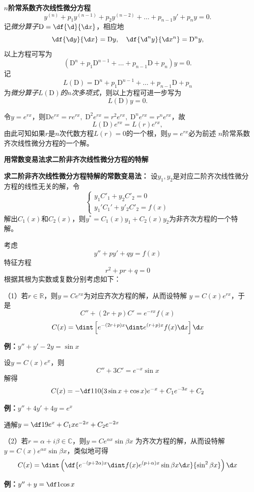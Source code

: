 \begin{shaded}
	{\bf $n$阶常系数齐次线性微分方程}
	$$y^{(n)}+p_1y^{(n-1)}+p_2y^{(n-2)}+\ldots+p_{n-1}y'+p_ny=0.$$
	记{\it 微分算子}$\mathrm{D}=\df{\d}{\d x}$，相应地
	$$\df{\d y}{\d x}=\mathrm{D}y,\quad \df{\d^n y}{\d x^n}=\mathrm{D}^ny,$$
	以上方程可写为
	$$(\mathrm{D}^n+p_1\mathrm{D}^{n-1}+\ldots+p_{n-1}\mathrm{D}
	+p_n)y=0.$$
	记
	$$L(\mathrm{D})=\mathrm{D}^n+p_1\mathrm{D}^{n-1}+\ldots+p_{n-1}\mathrm{D}
	+p_n$$
	为{\it 微分算子$L(\mathrm{D})$的$n$次多项式}，则以上方程可进一步写为
	$$L(\mathrm{D})y=0.$$
	
	令$y=e^{rx}$，则$\mathrm{D}e^{rx}=re^{rx},\;\mathrm{D}^2e^{rx}=r^2e^{rx},
	\;\mathrm{D}^ne^{rx}=r^ne^{rx}$，故
	$$L(\mathrm{D})e^{rx}=L(r)e^{rx},$$
	由此可知如果$r$是$n$次代数方程$L(r)=0$的一个根，则$y=e^{rx}$必为前述
	$n$阶常系数齐次线性微分方程的一个解。

	{\bf 用常数变易法求二阶非齐次线性微分方程的特解}
	
	\begin{tcolorbox}
		{\bf 求二阶非齐次线性微分方程特解的常数变易法：}
		设$y_1,y_2$是对应二阶齐次线性微分方程的线性无关的解，令	
		$$
		\left\{\begin{array}{l}
		y_1C'_1+y_2C'_2=0\\
		y_1'C_1'+y'_2C'_2=f(x)
		\end{array}\right.
		$$
		解出$C_1(x)$和$C_2(x)$，则$y^*=C_1(x)y_1+C_2(x)y_2$为非齐次方程的一个特解。
	\end{tcolorbox}
	
	考虑
	$$y''+py'+qy=f(x)$$
	特征方程
	$$r^2+pr+q=0$$
	根据其根为实数或复数分别考虑如下：
	
	（1）若$r\in\mathbb{R}$，则$y=Ce^{rx}$为对应齐次方程的解，从而设特解
	$y=C(x)e^{rx}$，于是
	$$C''+(2r+p)C'=e^{-rx}f(x)$$
	$$C(x)=\dint\left[e^{-(2r+p)x}\dint e^{(r+p)x}f(x)\d x\right]\d x$$
	
	{\bf 例：}$y''+y'-2y=\sin x$
	
	设$y=C(x)e^x$，则
	$$C''+3C'=e^{-x}\sin x$$
	解得
	$$C(x)=-\df1{10}(3\sin x+\cos x)e^{-x}+C_1e^{-3x}+C_2$$
	
	{\bf 例：}$y''+4y'+4y=e^x$
	
	通解$y=\df19e^x+C_1xe^{-2x}+C_2e^{-2x}$
	
	（2）若$r=\alpha+i\beta\in\mathbb{C}$，则$y=Ce^{\alpha x}\sin\beta x$
	为齐次方程的解，从而设特解$y=C(x)e^{\alpha x}\sin\beta x$，类似地可得
	$$C(x)=\dint\left(\df{e^{-(p+2\alpha)x}\dint f(x)
	e^{(p+\alpha)x}\sin\beta x\d x}{\sin^2\beta x}\right)\d x$$
	
	{\bf 例：}$y''+y=\df1{\cos x}$
	

\end{shaded}
